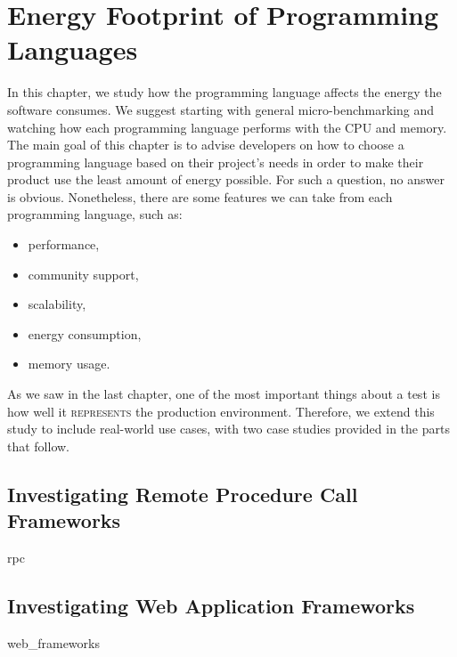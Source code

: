 \chapter{Energy Footprint of Programming Languages}
\label{chapter:porgramming_langauges}
In this chapter, we study how the programming language affects the energy the software consumes.
We suggest starting with general micro-benchmarking and watching how each programming language performs with the CPU and memory.
The main goal of this chapter is to advise developers on how to choose a programming language based on their project's needs in order to make their product use the least amount of energy possible.
For such a question, no answer is obvious.
Nonetheless, there are some features we can take from each programming language, such as: 
\begin{itemize}
    \item performance,
    \item community support,
    \item scalability,
    \item energy consumption,
    \item memory usage.
\end{itemize}

As we saw in the last chapter, one of the most important things about a test is how well it \textsc{represents} the production environment.
Therefore, we extend this study to include real-world use cases, with two case studies provided in the parts that follow. 

\section{Investigating Remote Procedure Call Frameworks}
{rpc}

\section{Investigating Web Application Frameworks}
{web_frameworks}